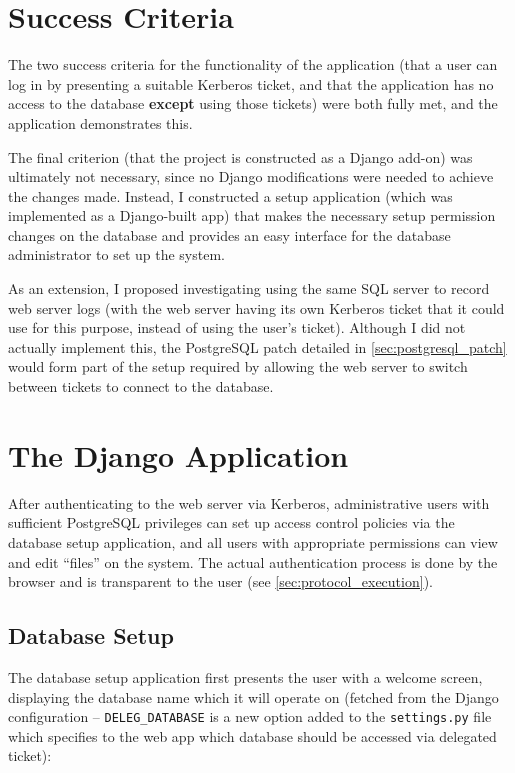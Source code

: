 \documentclass[12pt]{report}
\begin{document}
\section{Success Criteria}
The two success criteria for the functionality of the application (that a user can log in by presenting a suitable Kerberos ticket, and that the application has no access to the database \textbf{except} using those tickets) were both fully met, and the application demonstrates this.

The final criterion (that the project is constructed as a Django add-on) was ultimately not necessary, since no Django modifications were needed to achieve the changes made. Instead, I constructed a setup application (which was implemented as a Django-built app) that makes the necessary setup permission changes on the database and provides an easy interface for the database administrator to set up the system.

As an extension, I proposed investigating using the same SQL server to record web server logs (with the web server having its own Kerberos ticket that it could use for this purpose, instead of using the user's ticket). Although I did not actually implement this, the PostgreSQL patch detailed in \autoref{sec:postgresql_patch} would form part of the setup required by allowing the web server to switch between tickets to connect to the database.

\section{The Django Application}
After authenticating to the web server via Kerberos, administrative users with sufficient PostgreSQL privileges can set up access control policies via the database setup application, and all users with appropriate permissions can view and edit ``files'' on the system. The actual authentication process is done by the browser and is transparent to the user (see \autoref{sec:protocol_execution}).

\subsection{Database Setup}
The database setup application first presents the user with a welcome screen, displaying the database name which it will operate on (fetched from the Django configuration -- \verb+DELEG_DATABASE+ is a new option added to the \verb+settings.py+ file which specifies to the web app which database should be accessed via delegated ticket):
\end{document}
